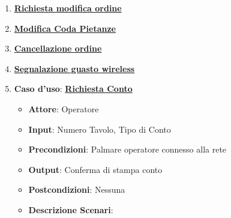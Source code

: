 \begin{enumerate}
\begin{itemize}
\begin{itemize}
            \item \uline{{\bf Scenario 2}}:
            \begin{itemize}
                \item L'utente chiama per la prenotazione di un men\`u fisso
                \item L'operatore controlla la disponibilit\`a del men\`u
                \item L'operatore comunica la disponibilit\`a del men\`u all'utente
                \item L'utente conferma la prenotazione
            \end{itemize}
            \item \uline{{\bf Scenario 3}}
            \begin{itemize}
                \item L'utente chiama per la prenotazione di una sala
                \item L'operatore controlla la disponibilit\`a della sala
                \item L'operatore comunica la disponibilit\`a della sala
                \item L'utente concorda il men\`u con il proprietario
                \item L'utente conferma la prenotazione
            \end{itemize}
        \end{itemize}
    \end{itemize}
    \item \uline {{\bf Richiesta modifica ordine}}
    \item \uline {{\bf Modifica Coda Pietanze}}
    \item \uline {{\bf Cancellazione ordine}}
    \item \uline {{\bf Segnalazione guasto wireless}}
    \item {\bf Caso d'uso}: \uline{{\bf Richiesta Conto}}
    \begin{itemize}
        \item {\bf Attore}: Operatore
        \item {\bf Input}: Numero Tavolo, Tipo di Conto
        \item {\bf Precondizioni}: Palmare operatore connesso alla rete
        \item {\bf Output}: Conferma di stampa conto
        \item {\bf Postcondizioni}: Nessuna
        \item {\bf Descrizione Scenari}:

\end{itemize}
\end{enumerate}
